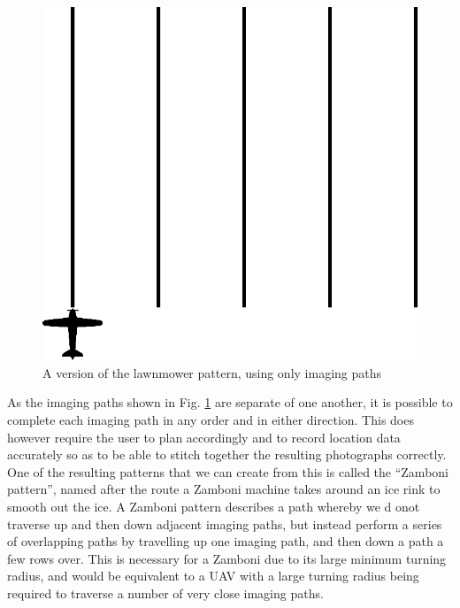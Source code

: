 \begin{figure}[htbp!] 
\centering    
\includegraphics[width=0.3\textheight]{ImagingLawnmower}
\caption[Imaging Lawnmower Pattern]{A version of the lawnmower pattern, using only imaging paths}
\label{fig:imaginglawnmower}
\end{figure}

As the imaging paths shown in Fig. \ref{fig:imaginglawnmower} are separate of one another, it is possible to complete each imaging path in any order and in either direction. This does however require the user to plan accordingly and to record location data accurately so as to be able to stitch together the resulting photographs correctly. One of the resulting patterns that we can create from this is called the ``Zamboni pattern'', named after the route a Zamboni machine takes around an ice rink to smooth out the ice. A Zamboni pattern describes a path whereby we d onot traverse up and then down adjacent imaging paths, but instead perform a series of overlapping paths by travelling up one imaging path, and then down a path a few rows over. This is necessary for a Zamboni due to its large minimum turning radius, and would be equivalent to a UAV with a large turning radius being required to traverse a number of very close imaging paths. 

